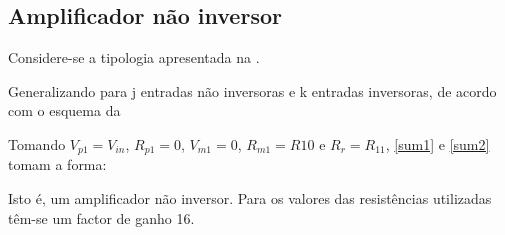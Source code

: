\documentclass[%
  reprint,
  nofootinbib,
  amsmath,amssymb,
  aps,
  10pt,
  a4paper
]{revtex4-1}
\begin{document}
\subsection{Amplificador não inversor}

Considere-se a tipologia apresentada na .




Generalizando para j entradas não inversoras e k entradas inversoras, de acordo com o esquema da 

Tomando $V_{p1}=V_{in}$, $R_{p1}=0$, $V_{m1}=0$, $R_{m1}=R10$ e $R_r = R_{11}$, \eqref{sum1} e \eqref{sum2} tomam a forma:

Isto é, um amplificador não inversor. Para os valores das resistências utilizadas têm-se um factor de ganho 16.
\end{document}
